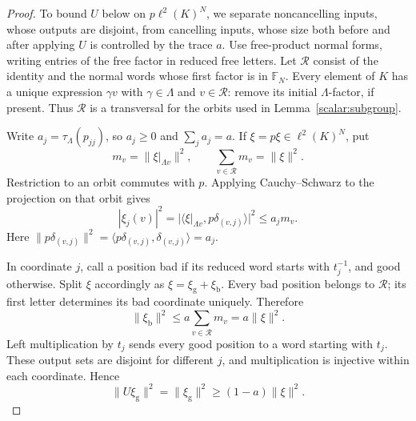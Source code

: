 \begin{proof}
To bound \(U\) below on \(p\ell^2(K)^N\), we separate
noncancelling inputs, whose outputs are disjoint, from cancelling
inputs, whose size both before and after applying \(U\) is controlled
by the trace \(a\).
Use free-product normal forms, writing entries of the free factor
in reduced free letters. Let \(\mathcal R\) consist of the identity
and the normal words whose first factor is in \(\mathbb F_N\).
Every element of \(K\) has a unique expression \(\gamma v\) with
\(\gamma\in\Lambda\) and \(v\in\mathcal R\): remove its initial
\(\Lambda\)-factor, if present. Thus \(\mathcal R\) is a transversal
for the orbits used in Lemma~\ref{scalar:subgroup}.

Write \(a_j=\tau_\Lambda(p_{jj})\), so
\(a_j\ge0\) and \(\sum_j a_j=a\). If
\(\xi=p\xi\in\ell^2(K)^N\), put
\[
 m_v=\|\xi|_{\Lambda v}\|^2,\qquad
 \sum_{v\in\mathcal R}m_v=\|\xi\|^2.
\]
Restriction to an orbit commutes with \(p\).
Applying Cauchy--Schwarz to the projection on that orbit gives
\begin{equation}
 |\xi_j(v)|^2
 =|\langle \xi|_{\Lambda v},p\delta_{(v,j)}\rangle|^2
 \le a_jm_v.
 \label{scalar:pointwise}
\end{equation}
Here
\(\|p\delta_{(v,j)}\|^2
=\langle p\delta_{(v,j)},\delta_{(v,j)}\rangle=a_j\).

In coordinate \(j\), call a position bad if its reduced word starts
with \(t_j^{-1}\), and good otherwise. Split \(\xi\) accordingly as
\(\xi=\xi_{\mathrm g}+\xi_{\mathrm b}\).
Every bad position belongs to \(\mathcal R\); its first letter
determines its bad coordinate uniquely. Therefore
\begin{equation}
 \|\xi_{\mathrm b}\|^2
 \le a\sum_{v\in\mathcal R}m_v=a\|\xi\|^2.
 \label{scalar:bad-input}
\end{equation}
Left multiplication by \(t_j\) sends every good position to a word
starting with \(t_j\). These output sets are disjoint for different
\(j\), and multiplication is injective within each coordinate. Hence
\begin{equation}
 \|U\xi_{\mathrm g}\|^2
 =\|\xi_{\mathrm g}\|^2
 \ge(1-a)\|\xi\|^2.
 \label{scalar:good-output}
\end{equation}


\end{proof}
